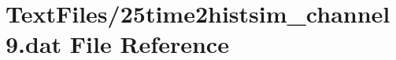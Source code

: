 \hypertarget{25time2histsim__channel9_8dat}{}\section{Text\+Files/25time2histsim\+\_\+channel9.dat File Reference}
\label{25time2histsim__channel9_8dat}

